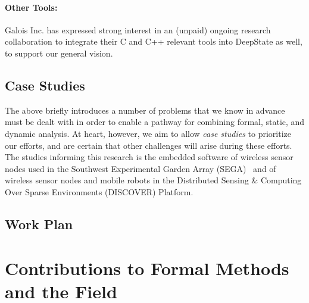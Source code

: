 \paragraph{Other Tools:}  Galois Inc. has expressed strong interest in
an (unpaid) ongoing research collaboration to integrate their C and
C++ relevant tools into DeepState as well, to support our general vision.

\subsection{Case Studies} %
\label{sec:case-study}

The above briefly introduces a number of problems that we know in advance must
be dealt with in order to enable a pathway for combining formal,
static, and dynamic analysis.    At heart, however, we aim to allow
\emph{case studies} to prioritize our efforts, and
are certain that other challenges will arise during these efforts.
The studies informing this research is the embedded software of wireless sensor nodes used in the Southwest Experimental Garden Array (SEGA)~\cite{ClaEtAl11,GhoEtAl2014,BelEtAl2015} and of wireless sensor nodes and mobile robots in the Distributed Sensing \& Computing Over Sparse Environments (DISCOVER) Platform.




% 

\subsection{Work Plan}


\section{Contributions to Formal Methods and the Field}
\label{sec:contributions}



